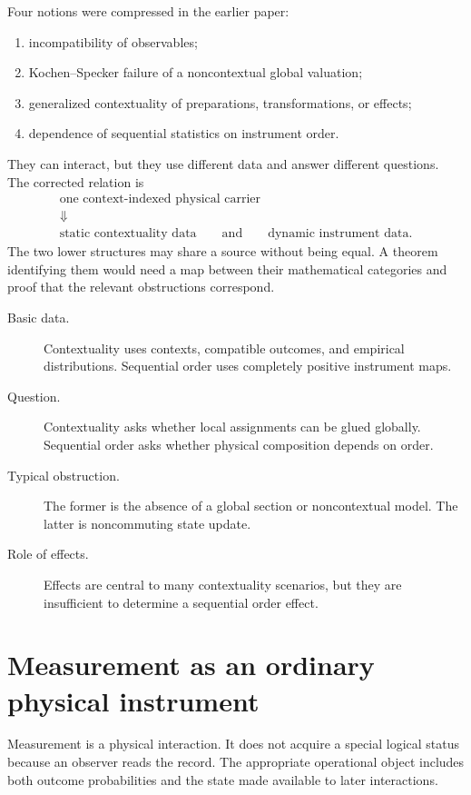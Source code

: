 \documentclass[11pt]{article}
\begin{document}
Four notions were compressed in the earlier paper:
\begin{enumerate}
\item incompatibility of observables;
\item Kochen--Specker failure of a noncontextual global valuation;
\item generalized contextuality of preparations, transformations, or effects;
\item dependence of sequential statistics on instrument order.
\end{enumerate}
They can interact, but they use different data and answer different questions.
The corrected relation is
\[
\boxed{
\begin{gathered}
\text{one context-indexed physical carrier}\\
\Downarrow\\
\text{static contextuality data}
\qquad\text{and}\qquad
\text{dynamic instrument data}.
\end{gathered}}
\]
The two lower structures may share a source without being equal. A theorem
identifying them would need a map between their mathematical categories and
proof that the relevant obstructions correspond.

\begin{description}
\item[Basic data.] Contextuality uses contexts, compatible outcomes, and
empirical distributions. Sequential order uses completely positive instrument
maps.
\item[Question.] Contextuality asks whether local assignments can be glued
globally. Sequential order asks whether physical composition depends on order.
\item[Typical obstruction.] The former is the absence of a global section or
noncontextual model. The latter is noncommuting state update.
\item[Role of effects.] Effects are central to many contextuality scenarios,
but they are insufficient to determine a sequential order effect.
\end{description}

\section{Measurement as an ordinary physical instrument}

Measurement is a physical interaction. It does not acquire a special logical
status because an observer reads the record. The appropriate operational
object includes both outcome probabilities and the state made available to
later interactions.
\end{document}
